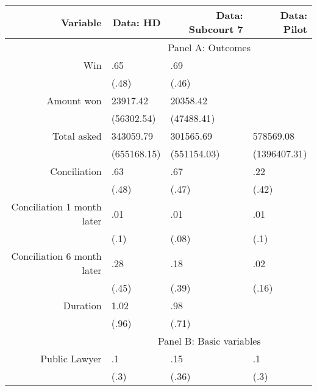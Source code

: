 \begin{tabular}{rrrr}
\toprule
Variable & Data: HD & Data: Subcourt 7 & Data: Pilot \\
\midrule
      & \multicolumn{3}{c}{Panel A: Outcomes} \\
      \midrule
      \midrule
Win   & \multicolumn{1}{l}{.65} & \multicolumn{1}{l}{.69} & \multicolumn{1}{l}{} \\
      & \multicolumn{1}{l}{(.48)} & \multicolumn{1}{l}{(.46)} & \multicolumn{1}{l}{} \\
Amount won & \multicolumn{1}{l}{23917.42} & \multicolumn{1}{l}{20358.42} & \multicolumn{1}{l}{} \\
      & \multicolumn{1}{l}{(56302.54)} & \multicolumn{1}{l}{(47488.41)} & \multicolumn{1}{l}{} \\
Total asked & \multicolumn{1}{l}{343059.79} & \multicolumn{1}{l}{301565.69} & \multicolumn{1}{l}{578569.08} \\
      & \multicolumn{1}{l}{(655168.15)} & \multicolumn{1}{l}{(551154.03)} & \multicolumn{1}{l}{(1396407.31)} \\
Conciliation  & \multicolumn{1}{l}{.63} & \multicolumn{1}{l}{.67} & \multicolumn{1}{l}{.22} \\
      & \multicolumn{1}{l}{(.48)} & \multicolumn{1}{l}{(.47)} & \multicolumn{1}{l}{(.42)} \\
Conciliation 1 month later & \multicolumn{1}{l}{.01} & \multicolumn{1}{l}{.01} & \multicolumn{1}{l}{.01} \\
      & \multicolumn{1}{l}{(.1)} & \multicolumn{1}{l}{(.08)} & \multicolumn{1}{l}{(.1)} \\
Conciliation 6 month later & \multicolumn{1}{l}{.28} & \multicolumn{1}{l}{.18} & \multicolumn{1}{l}{.02} \\
      & \multicolumn{1}{l}{(.45)} & \multicolumn{1}{l}{(.39)} & \multicolumn{1}{l}{(.16)} \\
Duration & \multicolumn{1}{l}{1.02} & \multicolumn{1}{l}{.98} & \multicolumn{1}{l}{} \\
      & \multicolumn{1}{l}{(.96)} & \multicolumn{1}{l}{(.71)} & \multicolumn{1}{l}{} \\
      \midrule
      & \multicolumn{3}{c}{Panel B: Basic variables} \\
      \midrule
      \midrule
Public Lawyer & \multicolumn{1}{l}{.1} & \multicolumn{1}{l}{.15} & \multicolumn{1}{l}{.1} \\
      & \multicolumn{1}{l}{(.3)} & \multicolumn{1}{l}{(.36)} & \multicolumn{1}{l}{(.3)} \\

\end{tabular}
